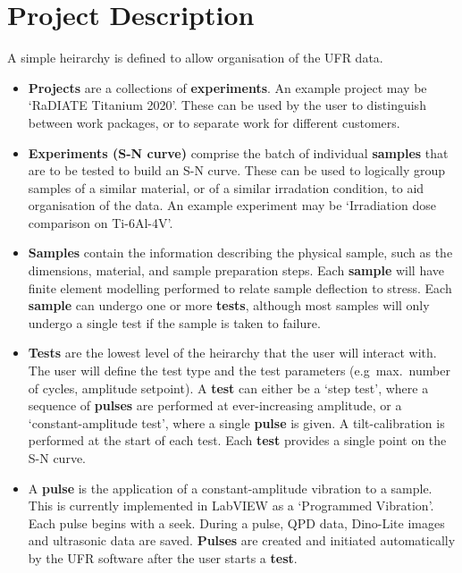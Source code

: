 \documentclass[a4paper,12pt]{article}
\begin{document}
\section*{Project Description}

A simple heirarchy is defined to allow organisation of the UFR data.


\begin{itemize}
  \item{
    \textbf{Projects} are a collections of \textbf{experiments}.
    An example project may be `RaDIATE Titanium 2020'.
    These can be used by the user to distinguish between work packages, or to separate work for different customers.
  }
  \item{
    \textbf{Experiments (S-N curve)} comprise the batch of individual \textbf{samples} that are to be tested to build an S-N curve.
    These can be used to logically group samples of a similar material, or of a similar irradation condition, to aid organisation of the data.
    An example experiment may be `Irradiation dose comparison on Ti-6Al-4V'.
  }
  \item{
    \textbf{Samples} contain the information describing the physical sample, such as the dimensions, material, and sample preparation steps.
    Each \textbf{sample} will have finite element modelling performed to relate sample deflection to stress.
    Each \textbf{sample} can undergo one or more \textbf{tests}, although most samples will only undergo a single test if the sample is taken to failure.
  }
  \item{
    \textbf{Tests} are the lowest level of the heirarchy that the user will interact with. The user will define the test type and the test parameters (e.g\ max.\ number of cycles, amplitude setpoint).
    A \textbf{test} can either be a `step test', where a sequence of \textbf{pulses} are performed at ever-increasing amplitude, or a `constant-amplitude test', where a single \textbf{pulse} is given.
    A tilt-calibration is performed at the start of each test.
    Each \textbf{test} provides a single point on the S-N curve.
  }
  \item{
    A \textbf{pulse} is the application of a constant-amplitude vibration to a sample.
    This is currently implemented in LabVIEW as a `Programmed Vibration'.
    Each pulse begins with a seek.
    During a pulse, QPD data, Dino-Lite images and ultrasonic data are saved.
    \textbf{Pulses} are created and initiated automatically by the UFR software after the user starts a \textbf{test}.
  }  
\end{itemize}
\end{document}
